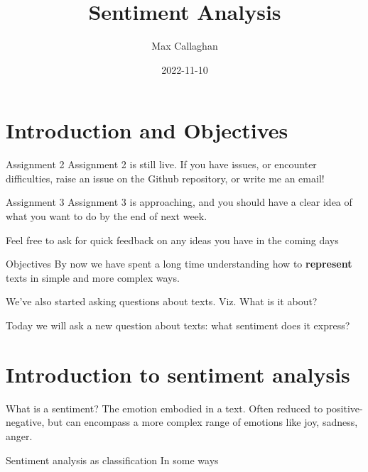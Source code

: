 \documentclass[
  10pt,
  ignorenonframetext,
  aspectratio=169]{beamer}
\title{Sentiment Analysis}
\author{Max Callaghan}
\date{2022-11-10}
\begin{document}
\frame{\titlepage}

\hypertarget{introduction-and-objectives}{%
\section{Introduction and
Objectives}\label{introduction-and-objectives}}

\begin{frame}{Assignment 2}
\protect\hypertarget{assignment-2}{}
Assignment 2 is still live. If you have issues, or encounter
difficulties, raise an issue on the Github repository, or write me an
email!
\end{frame}

\begin{frame}{Assignment 3}
\protect\hypertarget{assignment-3}{}
Assignment 3 is approaching, and you should have a clear idea of what
you want to do by the end of next week.

Feel free to ask for quick feedback on any ideas you have in the coming
days
\end{frame}

\begin{frame}{Objectives}
\protect\hypertarget{objectives}{}
By now we have spent a long time understanding how to \textbf{represent}
texts in simple and more complex ways.

We've also started asking questions about texts. Viz. What is it about?

Today we will ask a new question about texts: what sentiment does it
express?
\end{frame}

\hypertarget{introduction-to-sentiment-analysis}{%
\section{Introduction to sentiment
analysis}\label{introduction-to-sentiment-analysis}}

\begin{frame}{What is a sentiment?}
\protect\hypertarget{what-is-a-sentiment}{}
The emotion embodied in a text. Often reduced to positive-negative, but
can encompass a more complex range of emotions like joy, sadness, anger.
\end{frame}

\begin{frame}{Sentiment analysis as classification}
\protect\hypertarget{sentiment-analysis-as-classification}{}
In some ways
\end{frame}
\end{document}
